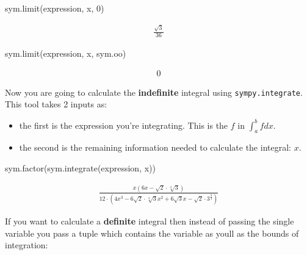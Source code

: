 \begin{pyin}
sym.limit(expression, x, 0)
\end{pyin}




\begin{equation*}
\begin{split}\displaystyle \frac{\sqrt{3}}{36}\end{split}
\end{equation*}






\begin{pyin}
sym.limit(expression, x, sym.oo)
\end{pyin}




\begin{equation*}
\begin{split}\displaystyle 0\end{split}
\end{equation*}




Now you are going to calculate the \textbf{indefinite} integral using
\texttt{sympy.integrate}. This tool takes 2 inputs as:
\begin{itemize}
\item 

the first is the expression you’re integrating. This is the \(f\) in \(\int_a^b f
dx\).

\item 

the second is the remaining information needed to calculate the integral: \(x\).

\end{itemize}




\begin{pyin}
sym.factor(sym.integrate(expression, x))
\end{pyin}




\begin{equation*}
\begin{split}\displaystyle \frac{x \left(6 x - \sqrt{2} \cdot \sqrt[4]{3}\right)}{12 \cdot \left(4 x^{3} - 6 \sqrt{2} \cdot \sqrt[4]{3} x^{2} + 6 \sqrt{3} x - \sqrt{2} \cdot 3^{\frac{3}{4}}\right)}\end{split}
\end{equation*}




If you want to calculate a \textbf{definite} integral then instead of passing the
single variable you pass a tuple which contains the variable as youll as the
bounds of integration:




